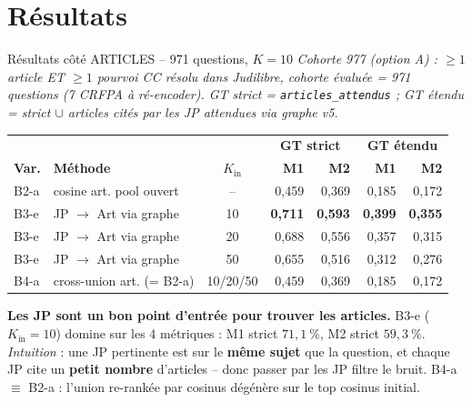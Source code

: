 \documentclass[aspectratio=169,10pt]{beamer}
\newcommand{\okbox}[1]{%
  \begin{center}
  \colorbox{green!10}{\parbox{0.92\linewidth}{\centering #1}}
  \end{center}}
\begin{document}
\section{Résultats}

\begin{frame}{Résultats côté ARTICLES -- 971 questions, $K{=}10$}
  \scriptsize
  \textit{Cohorte 977 (option A) : $\ge 1$ article ET $\ge 1$ pourvoi CC résolu dans Judilibre,
  cohorte évaluée = 971 questions (7 CRFPA à ré-encoder). GT strict = \texttt{articles\_attendus} ;
  GT étendu = strict $\cup$ articles cités par les JP attendues via graphe v5.}

  \vspace{0.4em}
  \renewcommand{\arraystretch}{1.1}
  \setlength{\tabcolsep}{4pt}
  \begin{center}
  \begin{tabular}{@{}l l c | r r | r r@{}}
    \toprule
    & & & \multicolumn{2}{c|}{\textbf{GT strict}} & \multicolumn{2}{c}{\textbf{GT étendu}} \\
    \textbf{Var.} & \textbf{Méthode}
    & $K_{\text{in}}$
    & \textbf{M1} & \textbf{M2}
    & \textbf{M1} & \textbf{M2} \\
    \midrule
    B2-a & cosine art. pool ouvert        & --     & 0,459 & 0,369 & 0,185 & 0,172 \\
    \midrule
    \rowcolor{accentsoft}
    B3-e & JP $\to$ Art via graphe        & 10     & \textbf{0,711} & \textbf{0,593} & \textbf{0,399} & \textbf{0,355} \\
    \rowcolor{accentsoft}
    B3-e & JP $\to$ Art via graphe        & 20     & 0,688 & 0,556 & 0,357 & 0,315 \\
    \rowcolor{accentsoft}
    B3-e & JP $\to$ Art via graphe        & 50     & 0,655 & 0,516 & 0,312 & 0,276 \\
    \midrule
    B4-a & cross-union art. (= B2-a)      & 10/20/50 & 0,459 & 0,369 & 0,185 & 0,172 \\
    \bottomrule
  \end{tabular}
  \end{center}

  \vspace{0.5em}
  \okbox{\scriptsize\textbf{Les JP sont un bon point d'entrée pour trouver les articles.}
  B3-e ($K_{\text{in}}{=}10$) domine sur les 4 métriques : M1 strict $71{,}1~\%$, M2 strict $59{,}3~\%$.
  \emph{Intuition} : une JP pertinente est sur le \textbf{même sujet} que la question, et chaque JP
  cite un \textbf{petit nombre} d'articles -- donc passer par les JP filtre le bruit. B4-a $\equiv$ B2-a :
  l'union re-rankée par cosinus dégénère sur le top cosinus initial.}
\end{frame}
\end{document}
